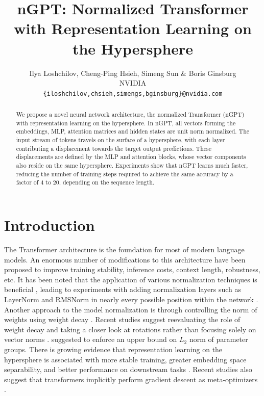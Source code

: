 \documentclass{article} %
\title{nGPT: Normalized Transformer with Representation Learning on the Hypersphere}
\author{Ilya Loshchilov, Cheng-Ping Hsieh, Simeng Sun \& Boris Ginsburg \\
NVIDIA\\
\texttt{\{iloshchilov,chsieh,simengs,bginsburg\}@nvidia.com} 
}
\begin{document}
\maketitle

\begin{abstract}
We propose a novel neural network architecture, the normalized Transformer (nGPT) with representation learning on the hypersphere. In nGPT, all vectors forming the embeddings, MLP, attention matrices and hidden states are unit norm normalized. The input stream of tokens travels on the surface of a hypersphere, with each layer contributing a displacement towards the target output predictions. These displacements are defined by the MLP and attention blocks, whose vector components also reside on the same hypersphere. Experiments show that nGPT learns much faster, reducing the number of training steps required to achieve the same accuracy by a factor of 4 to 20, depending on the sequence length.
\end{abstract}

\section{Introduction}
The Transformer architecture  \citep{vaswani2017attention} is the foundation  for most of modern   language models. An enormous number of modifications to this architecture have been proposed to improve training stability,  inference costs, context length, robustness, etc. It has been noted that the application of various normalization techniques is beneficial \citep{salimans2016weight}, leading to experiments with adding normalization layers such as LayerNorm and RMSNorm in nearly every possible position within the network \citep{xiong2020layer}. Another approach to the model  normalization is through controlling the norm of weights using weight decay \citep{loshchilov2017decoupled}.  Recent studies  \citep{andriushchenko2023we} suggest reevaluating the role of weight decay and taking a closer look at rotations rather than focusing solely on vector norms \citep{kodryan2022training,kosson2023rotational}. \citet{franke2023cpr} suggested to enforce an upper bound on $L_2$ norm of parameter groups. There is growing evidence that representation learning on the hypersphere is associated with more stable training, greater embedding space separability, and better performance on downstream tasks \citep{wang2020understanding}. Recent studies also suggest that transformers implicitly perform gradient descent as meta-optimizers \citep{von2023transformers, dai2022can}. 
\end{document}
